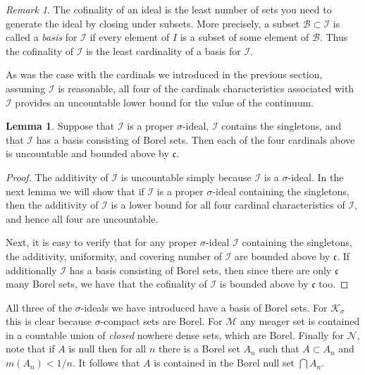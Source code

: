\documentclass[11pt,oneside]{amsart}
\theoremstyle{definition}
\newtheorem{lem}[thm]{Lemma}
\theoremstyle{definition}
\theoremstyle{remark}
\newtheorem{rem}[thm]{Remark}
\begin{document}
\begin{rem}
The cofinality of an ideal is the least number of sets you need to generate the ideal by closing under subsets. More precisely, a subset $\mathcal B\subset\mathcal I$ is called a \emph{basis} for $\mathcal I$ if every element of $I$ is a subset of some element of $\mathcal B$. Thus the cofinality of $\mathcal I$ is the least cardinality of a basis for $\mathcal I$.
\end{rem}

As was the case with the cardinals we introduced in the previous section, assuming $\mathcal I$ is reasonable, all four of the cardinals characteristics associated with $\mathcal I$ provides an uncountable lower bound for the value of the continuum.

\begin{lem}
  Suppose that $\mathcal I$ is a proper $\sigma$-ideal, $\mathcal I$ contains the singletons, and that $\mathcal I$ has a basis consisting of Borel sets. Then each of the four cardinals above is uncountable and bounded above by $\mathfrak c$.
\end{lem}

\begin{proof}
  The additivity of $\mathcal I$ is uncountable simply because $\mathcal I$ is a $\sigma$-ideal. In the next lemma we will show that if $\mathcal I$ is a proper $\sigma$-ideal containing the singletons, then the additivity of $\mathcal I$ is a lower bound for all four cardinal characteristics of $\mathcal I$, and hence all four are uncountable.

  Next, it is easy to verify that for any proper $\sigma$-ideal $\mathcal I$ containing the singletons, the additivity, uniformity, and covering number of $\mathcal I$ are bounded above by $\mathfrak c$. If additionally $\mathcal I$ has a basis consisting of Borel sets, then since there are only $\mathfrak c$ many Borel sets, we have that the cofinality of $\mathcal I$ is bounded above by $\mathfrak c$ too.
\end{proof}

All three of the $\sigma$-ideals we have introduced have a basis of Borel sets. For $\mathcal K_\sigma$ this is clear because $\sigma$-compact sets are Borel. For $\mathcal M$ any meager set is contained in a countable union of \emph{closed} nowhere dense sets, which are Borel. Finally for $\mathcal N$, note that if $A$ is null then for all $n$ there is a Borel set $A_n$ such that $A\subset A_n$ and $m(A_n)<1/n$. It follows that $A$ is contained in the Borel null set $\bigcap A_n$.
\end{document}
